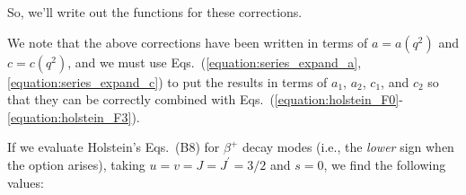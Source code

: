 

So, we'll write out the functions for these corrections.  
\unskip
\unskip
\unskip

We note that the above corrections have been written in terms of $a=a(q^2)$ and $c=c(q^2)$, and we must use Eqs.~(\ref{equation:series_expand_a}, \ref{equation:series_expand_c}) to put the results in terms of $a_1$,  $a_2$, $c_1$, and $c_2$ so that they can be correctly combined with Eqs.~(\ref{equation:holstein_F0}-\ref{equation:holstein_F3}).

If we evaluate Holstein's Eqs.~(B8) for $\beta^+$ decay modes (i.e., the \emph{lower} sign when the option arises), taking
$u=v=J=J^\prime=3/2$ and $s=0$, we find the following values:
\unskip  %


